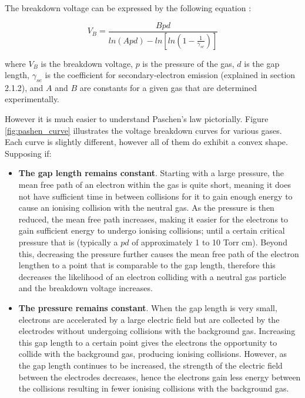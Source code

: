 The breakdown voltage can be expressed by the following equation \cite{Lieberman2005}:

\begin{equation}
	V_B = \frac{B p d}{ln(A p d) - ln[ln(1-\frac{1}{\gamma_{se}})]}
\end{equation}

where $V_B$ is the breakdown voltage, $p$ is the pressure of the gas, $d$ is the gap length, $\gamma_{se}$ is the coefficient for secondary-electron emission (explained in section 2.1.2), and $A$ and $B$ are constants for a given gas that are determined experimentally.

However it is much easier to understand Paschen's law pictorially. Figure \ref{fig:pashen_curve} illustrates the voltage breakdown curves for various gases. Each curve is slightly different, however all of them do exhibit a convex shape. Supposing if:

\begin{itemize}
    \item \textbf{The gap length remains constant}. Starting with a large pressure, the mean free path of an electron within the gas is quite short, meaning it does not have sufficient time in between collisions for it to gain enough energy to cause an ionising collision with the neutral gas. As the pressure is then reduced, the mean free path increases, making it easier for the electrons to gain sufficient energy to undergo ionising collisions; until a certain critical pressure that is (typically a $pd$ of approximately 1 to 10 Torr cm). Beyond this, decreasing the pressure further causes the mean free path of the electron lengthen to a point that is comparable to the gap length, therefore this decreases the likelihood of an electron colliding with a neutral gas particle and the breakdown voltage increases.
    \item \textbf{The pressure remains constant}. When the gap length is very small, electrons are accelerated by a large electric field but are collected by the electrodes without undergoing collisions with the background gas. Increasing this gap length to a certain point gives the electrons the opportunity to collide with the background gas, producing ionising collisions. However, as the gap length continues to be increased, the strength of the electric field between the electrodes decreases, hence the electrons gain less energy between the collisions resulting in fewer ionising collisions with the background gas.
\end{itemize}

